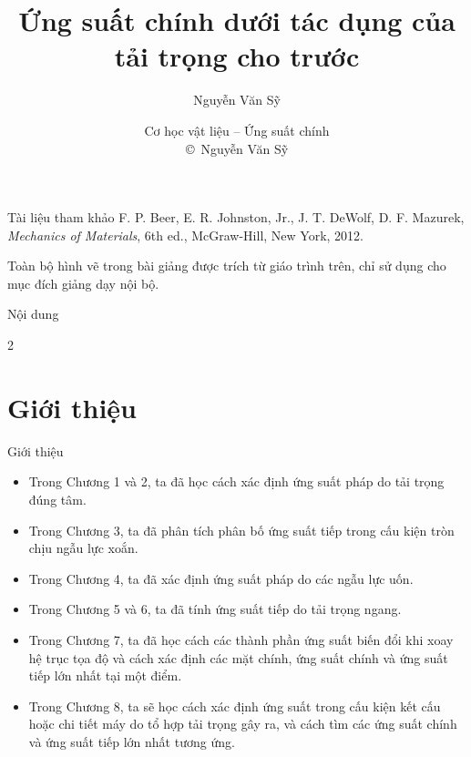 \documentclass[aspectratio=169]{beamer}
\title[Ứng suất chính]{Ứng suất chính dưới tác dụng của tải trọng cho trước}
\author[© N. V. Sỹ]{Nguyễn Văn Sỹ}
\institute[TNUT]{%
  Bộ môn Hệ thống Công nghiệp \\
  Trường Đại học Kỹ thuật Công nghiệp \\
  \href{mailto:vansy@tnut.edu.vn}{vansy@tnut.edu.vn}}
\date[Cơ học vật liệu]{\large Cơ học vật liệu – Ứng suất chính \\[0.5em] \footnotesize \copyright\ Nguyễn Văn Sỹ}
\begin{document}
\begin{frame}
  \titlepage
\end{frame}
\begin{frame}{Tài liệu tham khảo}
	\small
	F. P. Beer, E. R. Johnston, Jr., J. T. DeWolf, D. F. Mazurek,
	\emph{Mechanics of Materials}, 6th ed., McGraw-Hill, New York, 2012.
	
	\vspace{1em}
	\footnotesize\color{gray}
	Toàn bộ hình vẽ trong bài giảng được trích từ giáo trình trên, chỉ sử dụng
	cho mục đích giảng dạy nội bộ.
\end{frame}
\begin{frame}[t]{Nội dung}
  \hypertarget{outline}{}
  \scriptsize
  \begin{multicols}{2}
    \tableofcontents[hideallsubsections]
  \end{multicols}
\end{frame}

\section{Giới thiệu}
\begin{frame}[t]{Giới thiệu}
  \small
  \begin{itemize}
    \setlength{\itemsep}{0.6em}
    \item Trong Chương 1 và 2, ta đã học cách xác định ứng suất pháp do tải
          trọng đúng tâm.
    \item Trong Chương 3, ta đã phân tích phân bố ứng suất tiếp trong cấu
          kiện tròn chịu ngẫu lực xoắn.
    \item Trong Chương 4, ta đã xác định ứng suất pháp do các ngẫu lực uốn.
    \item Trong Chương 5 và 6, ta đã tính ứng suất tiếp do tải trọng ngang.
    \item Trong Chương 7, ta đã học cách các thành phần ứng suất biến đổi khi
          xoay hệ trục tọa độ và cách xác định các mặt chính, ứng suất chính và
          ứng suất tiếp lớn nhất tại một điểm.
    \item Trong Chương 8, ta sẽ học cách xác định ứng suất trong cấu kiện kết
          cấu hoặc chi tiết máy do tổ hợp tải trọng gây ra, và cách tìm các ứng
          suất chính và ứng suất tiếp lớn nhất tương ứng.
  \end{itemize}
\end{frame}
\end{document}
